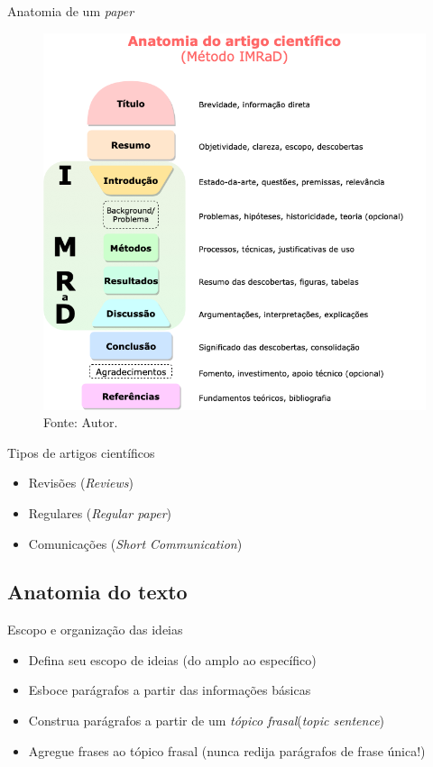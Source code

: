 \begin{frame}{Anatomia de um \textit{paper}}
\begin{figure}
\centering
\includegraphics[scale=0.28]{figs/05/artigo-imrad}
\caption{\scriptsize{Fonte: Autor.}}
\end{figure}
\end{frame}

\begin{frame}{Tipos de artigos científicos}
\begin{itemize}
\item Revisões (\emph{Reviews})
\item Regulares (\emph{Regular paper})
\item Comunicações (\emph{Short Communication})
\end{itemize}
\end{frame}

\subsection{Anatomia do texto}

\begin{frame}{Escopo e organização das ideias}
\begin{itemize}
\item Defina seu escopo de ideias (do amplo ao específico)
\item Esboce parágrafos a partir das informações básicas
\item Construa parágrafos a partir de um \textit{tópico frasal}(\textit{topic sentence})
\item Agregue frases ao tópico frasal (nunca redija parágrafos de frase única!)
\end{itemize}
\end{frame}

